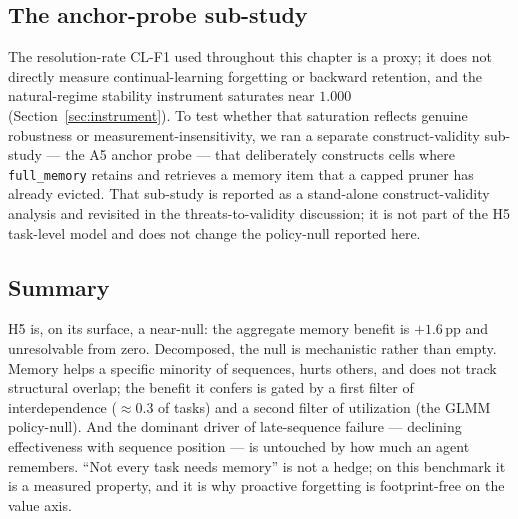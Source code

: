 \subsection{The anchor-probe sub-study}
\label{sec:a5}

The resolution-rate CL-F1 used throughout this chapter is a proxy; it does not directly
measure continual-learning forgetting or backward retention, and the natural-regime stability
instrument saturates near $1.000$ (Section~\ref{sec:instrument}). To test whether that
saturation reflects genuine robustness or measurement-insensitivity, we ran a separate
construct-validity sub-study --- the A5 anchor probe --- that deliberately constructs cells
where \texttt{full\_memory} retains and retrieves a memory item that a capped pruner has
already evicted. That sub-study is reported as a stand-alone construct-validity analysis and
revisited in the threats-to-validity discussion; it is not part of the H5 task-level model and
does not change the policy-null reported here.

\subsection{Summary}

H5 is, on its surface, a near-null: the aggregate memory benefit is $+1.6$\,pp and
unresolvable from zero. Decomposed, the null is mechanistic rather than empty. Memory helps a
specific minority of sequences, hurts others, and does not track structural overlap; the
benefit it confers is gated by a first filter of interdependence ($\approx 0.3$ of tasks) and
a second filter of utilization (the GLMM policy-null). And the dominant driver of late-sequence
failure --- declining effectiveness with sequence position --- is untouched by how much an
agent remembers. ``Not every task needs memory'' is not a hedge; on this benchmark it is a
measured property, and it is why proactive forgetting is footprint-free on the value axis.
